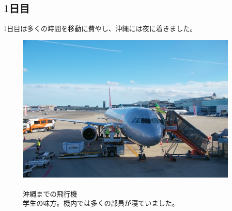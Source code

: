 \documentclass[../main]{subfiles}
\begin{document}
\subsection{1日目}
1日目は多くの時間を移動に費やし、沖縄には夜に着きました。\\
\begin{figure}[H]
  \begin{minipage}[b]{0.48\columnwidth}
    \centering
    \includegraphics[width=\columnwidth]{figure/hikouki.jpg}
  \end{minipage}
  \hspace{0.04\columnwidth} %
  \begin{minipage}[b]{0.48\columnwidth}
    \caption{\\
    沖縄までの飛行機\\
    学生の味方。機内では多くの部員が寝ていました。
    }
  \end{minipage}
\end{figure}
\end{document}
